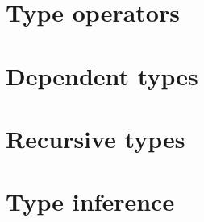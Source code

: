 \documentclass[ebook,oneside]{memoir} %
\begin{document}
      \chapter{Type operators}

      \chapter{Dependent types}

      \chapter{Recursive types}

      \chapter{Type inference}



  \backmatter


    \printbibliography[heading=bibintoc,title=References]

    \printindex
\end{document}
